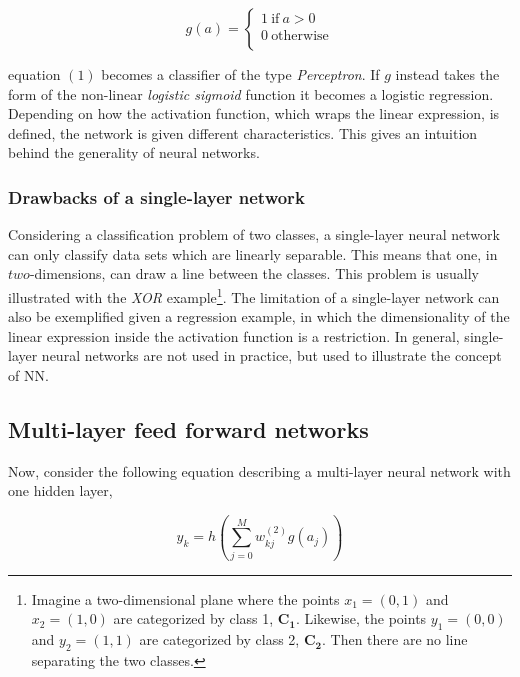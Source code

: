 \documentclass[12pt, letterpaper]{amsart}%
\begin{document}
\begin{equation}
g(a) = 
     \begin{cases}
       1 \ \text{if} \ a > 0 \\
       0 \ \text{otherwise} \\ 
     \end{cases}
\end{equation}

equation $(1)$ becomes a classifier of the type \textit{Perceptron}. If $g$ instead takes the form of the non-linear \textit{logistic sigmoid} function it becomes a logistic regression.
\\

Depending on how the activation function, which wraps the linear expression, is defined, the network is given different characteristics. This gives an intuition behind the generality of neural networks.

\subsubsection{Drawbacks of a single-layer network}
Considering a classification problem of two classes, a single-layer neural network can only classify data sets which are linearly separable. This means that one, in $two$-dimensions, can draw a line between the classes. This problem is usually illustrated with the \textit{XOR} example\footnote{Imagine a two-dimensional plane where the points $x_1 = (0,1)$ and $x_2 = (1,0)$ are categorized by class 1, $\mathbf{C_1}$. Likewise, the points $y_1=(0,0)$ and $y_2=(1,1)$ are categorized by class 2, $\mathbf{C_2}$. Then there are no line separating the two classes.}. The limitation of a single-layer network can also be exemplified given a regression example, in which the dimensionality of the linear expression inside the activation function is a restriction. In general, single-layer neural networks are not used in practice, but used to illustrate the concept of NN. 


\subsection{Multi-layer feed forward networks}
Now, consider the following equation describing a multi-layer neural network with one hidden layer,

\begin{equation}
y_k = h \left( \sum_{j=0}^M w_{kj}^{(2)} g \left( a_j \right) \right)
\end{equation}
\end{document}
